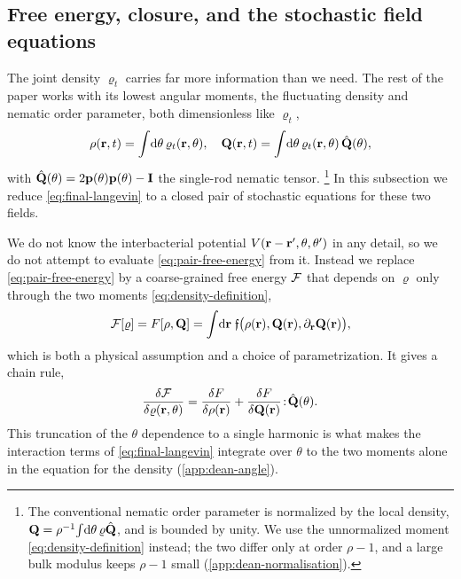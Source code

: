 \documentclass[aps,pre,reprint,superscriptaddress,longbibliography,nofootinbib
]{revtex4-2}
\begin{document}
\subsection{Free energy, closure, and the stochastic field equations}
\label{sec:model-closure}
The joint density $\varrho_t$ carries far more information
than we need. The rest of the paper works with its lowest
angular moments, the fluctuating density and nematic order
parameter, both dimensionless like $\varrho_t$,
\begin{align}
  \label{eq:density-definition}
    \rho(\mathbf{r},t) = \int\!\mathrm{d}\theta\,\varrho_t(\mathbf{r},\theta),
    \quad
    \mathbf{Q}(\mathbf{r},t) = \int\!\mathrm{d}\theta\,\varrho_t(\mathbf{r},\theta)\,\hat{\mathbf{Q}}(\theta),
\end{align}
with $\hat{\mathbf{Q}}(\theta)=2\mathbf{p}(\theta)\mathbf{p}(\theta)-\mathbf{I}$ the
single-rod nematic tensor.%
\footnote{%
The conventional nematic order parameter is normalized by
the local density,
$\mathbf{Q}=\rho^{-1}\!\int\!\mathrm{d}\theta\,\varrho\hat{\mathbf{Q}}$, and is
bounded by unity. We use the unnormalized moment
\cref{eq:density-definition} instead; the two differ only
at order $\rho-1$, and a large bulk modulus keeps $\rho-1$
small (\cref{app:dean-normalisation}).} In this subsection
we reduce \cref{eq:final-langevin} to a closed pair of
stochastic equations for these two fields.

We do not know the interbacterial potential
${V(\mathbf{r}-\mathbf{r}',\theta,\theta')}$ in any detail, so we do not
attempt to evaluate \cref{eq:pair-free-energy} from it.
Instead we replace \cref{eq:pair-free-energy} by a
coarse-grained free energy $\mathcal{F}$ that depends on
$\varrho$ only through the two moments
\cref{eq:density-definition},
\begin{align}
    \label{eq:free-energy-parametrisation}
    \mathcal{F}[\varrho] = F[\rho,\mathbf{Q}] = \int\!\mathrm{d}\mathbf{r}\;\mathfrak f\bigl(\rho(\mathbf{r}),\mathbf{Q}(\mathbf{r}),\partial_{\mathbf{r}}\mathbf{Q}(\mathbf{r})\bigr),
\end{align}
which is both a physical assumption and a choice of
parametrization. It gives a chain rule,
\begin{align}
    \label{eq:chain-rule}
    \frac{\delta\mathcal{F}}{\delta\varrho(\mathbf{r},\theta)}
    = \frac{\delta F}{\delta\rho(\mathbf{r})}
    + \frac{\delta F}{\delta\mathbf{Q}(\mathbf{r})}\!:\!\hat{\mathbf{Q}}(\theta).
\end{align}
This truncation of the $\theta$ dependence to a single
harmonic is what makes the interaction terms of
\cref{eq:final-langevin} integrate over $\theta$ to the two
moments alone in the equation for the density
(\cref{app:dean-angle}).
\end{document}
